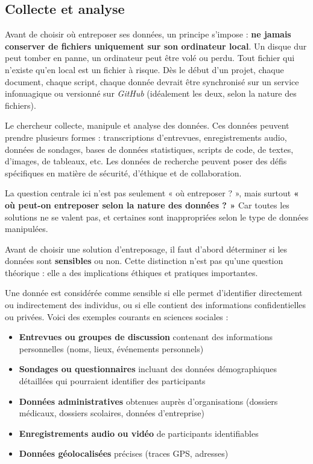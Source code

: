 \documentclass[
  letterpaper,
  DIV=11,
  numbers=noendperiod,
  oneside]{scrreprt}
\providecommand{\tightlist}{%
  \setlength{\itemsep}{0pt}\setlength{\parskip}{0pt}}\usepackage{longtable,booktabs,array}
\begin{document}
\hypertarget{collecte-et-analyse}{%
\subsection{Collecte et analyse}\label{collecte-et-analyse}}

Avant de choisir où entreposer ses données, un principe s'impose :
\textbf{ne jamais conserver de fichiers uniquement sur son ordinateur
local}. Un disque dur peut tomber en panne, un ordinateur peut être volé
ou perdu. Tout fichier qui n'existe qu'en local est un fichier à risque.
Dès le début d'un projet, chaque document, chaque script, chaque donnée
devrait être synchronisé sur un service infonuagique ou versionné sur
\emph{GitHub} (idéalement les deux, selon la nature des fichiers).

Le chercheur collecte, manipule et analyse des données. Ces données
peuvent prendre plusieurs formes : transcriptions d'entrevues,
enregistrements audio, données de sondages, bases de données
statistiques, scripts de code, de textes, d'images, de tableaux, etc.
Les données de recherche peuvent poser des défis spécifiques en matière
de sécurité, d'éthique et de collaboration.

La question centrale ici n'est pas seulement « où entreposer ? », mais
surtout \textbf{« où peut-on entreposer selon la nature des données ? »}
Car toutes les solutions ne se valent pas, et certaines sont
inappropriées selon le type de données manipulées.

Avant de choisir une solution d'entreposage, il faut d'abord déterminer
si les données sont \textbf{sensibles} ou non. Cette distinction n'est
pas qu'une question théorique : elle a des implications éthiques et
pratiques importantes.

Une donnée est considérée comme sensible si elle permet d'identifier
directement ou indirectement des individus, ou si elle contient des
informations confidentielles ou privées. Voici des exemples courants en
sciences sociales :

\begin{itemize}
\tightlist
\item
  \textbf{Entrevues ou groupes de discussion} contenant des informations
  personnelles (noms, lieux, événements personnels)
\item
  \textbf{Sondages ou questionnaires} incluant des données
  démographiques détaillées qui pourraient identifier des participants
\item
  \textbf{Données administratives} obtenues auprès d'organisations
  (dossiers médicaux, dossiers scolaires, données d'entreprise)
\item
  \textbf{Enregistrements audio ou vidéo} de participants identifiables
\item
  \textbf{Données géolocalisées} précises (traces GPS, adresses)
\end{itemize}
\end{document}
